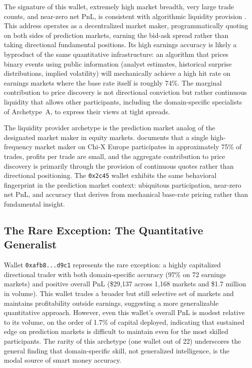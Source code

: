 \documentclass[11pt]{article}
\begin{document}
The signature of this wallet, extremely high market breadth, very large trade counts, and near-zero net PnL, is consistent with algorithmic liquidity provision \citep{menkveld2013high}. This address operates as a decentralized market maker, programmatically quoting on both sides of prediction markets, earning the bid-ask spread rather than taking directional fundamental positions. Its high earnings accuracy is likely a byproduct of the same quantitative infrastructure: an algorithm that prices binary events using public information (analyst estimates, historical surprise distributions, implied volatility) will mechanically achieve a high hit rate on earnings markets where the base rate itself is roughly 74\%. The marginal contribution to price discovery is not directional conviction but rather continuous liquidity that allows other participants, including the domain-specific specialists of Archetype~A, to express their views at tight spreads.

The liquidity provider archetype is the prediction market analog of the designated market maker in equity markets. \citet{menkveld2013high} documents that a single high-frequency market maker on Chi-X Europe participates in approximately 75\% of trades, profits per trade are small, and the aggregate contribution to price discovery is primarily through the provision of continuous quotes rather than directional positioning. The \texttt{0x2c45} wallet exhibits the same behavioral fingerprint in the prediction market context: ubiquitous participation, near-zero net PnL, and accuracy that derives from mechanical base-rate pricing rather than fundamental insight.

\subsection{The Rare Exception: The Quantitative Generalist}

Wallet \texttt{0xafb8...d9c1} represents the rare exception: a highly capitalized directional trader with both domain-specific accuracy (97\% on 72 earnings markets) and positive overall PnL (\$29,137 across 1,168 markets and \$1.7 million in volume). This wallet trades a broader but still selective set of markets and maintains profitability outside earnings, suggesting a more generalizable quantitative approach. However, even this wallet's overall PnL is modest relative to its volume, on the order of 1.7\% of capital deployed, indicating that sustained edge on prediction markets is difficult to maintain even for the most skilled participants. The rarity of this archetype (one wallet out of 22) underscores the general finding that domain-specific skill, not generalized intelligence, is the modal source of smart money accuracy.
\end{document}
